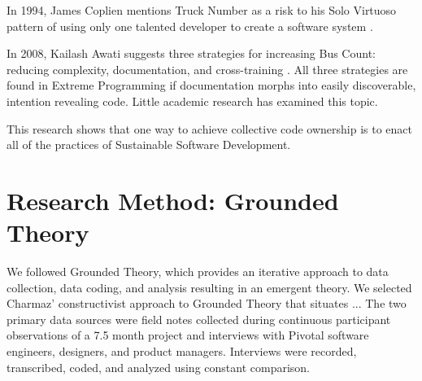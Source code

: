 In 1994, James Coplien mentions Truck Number as a risk to his Solo Virtuoso pattern of using only one talented developer to create a software system \cite{Coplien1994}. 

In 2008, Kailash Awati suggests three strategies for increasing Bus Count: reducing complexity, documentation, and cross-training \cite{AwatiBusFactor}. All three strategies are found in Extreme Programming if documentation morphs into easily discoverable, intention revealing code. Little academic research has examined this topic. 




This research shows that one way to achieve collective code ownership is to enact all of the practices of Sustainable Software Development.

\section{Research Method: Grounded Theory}
\label{ResearchMethod}

We followed Grounded Theory, \cite{Charmaz} which provides an iterative approach to data collection, data coding, and analysis resulting in an emergent theory. We selected Charmaz' constructivist approach to Grounded Theory that situates ...
The two primary data sources were field notes collected during continuous participant observations of a 7.5 month project and interviews with Pivotal software engineers, designers, and product managers. Interviews were recorded, transcribed, coded, and analyzed using constant comparison. 

